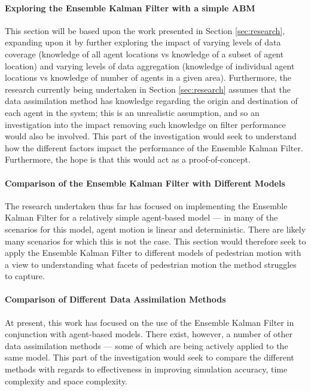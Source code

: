\paragraph{Exploring the Ensemble Kalman Filter with a simple ABM}

This section will be based upon the work presented in Section
\ref{sec:research}, expanding upon it by further exploring the impact of varying
levels of data coverage (knowledge of all agent locations vs knowledge of a
subset of agent location) and varying levels of data aggregation (knowledge of
individual agent locations vs knowledge of number of agents in a given area).
Furthermore, the research currently being undertaken in Section
\ref{sec:research} assumes that the data assimilation method has knowledge
regarding the origin and destination of each agent in the system; this is an
unrealistic assumption, and so an investigation into the impact removing such
knowledge on filter performance would also be involved. 
This part of the investigation would seek to understand how the different
factors impact the performance of the Ensemble Kalman Filter.
Furthermore, the hope is that this would act as a proof-of-concept.

\paragraph{Comparison of the Ensemble Kalman Filter with Different Models}

The research undertaken thus far has focused on implementing the Ensemble Kalman
Filter for a relatively simple agent-based model --- in many of the scenarios
for this model, agent motion is linear and deterministic.
There are likely many scenarios for which this is not the case.
This section would therefore seek to apply the Ensemble Kalman Filter to
different models of pedestrian motion with a view to understanding what facets
of pedestrian motion the method struggles to capture.

\paragraph{Comparison of Different Data Assimilation Methods}

At present, this work has focused on the use of the Ensemble Kalman Filter in
conjunction with agent-based models.
There exist, however, a number of other data assimilation methods --- some of
which are being actively applied to the same model.
This part of the investigation would seek to compare the different methods with
regards to effectiveness in improving simulation accuracy, time complexity and
space complexity.

